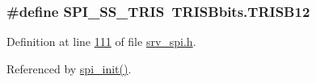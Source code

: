 \hypertarget{a00007_a1424f86a2482cfbcf68f709ce542e262}{
\subsubsection[{S\+P\+I\+\_\+\+S\+S\+\_\+\+T\+R\+I\+S}]{\setlength{\rightskip}{0pt plus 5cm}\#define S\+P\+I\+\_\+\+S\+S\+\_\+\+T\+R\+I\+S~T\+R\+I\+S\+Bbits.\+T\+R\+I\+S\+B12}}\label{a00007_a1424f86a2482cfbcf68f709ce542e262}


Definition at line \hyperlink{a00007_source_l00111}{111} of file \hyperlink{a00007_source}{srv\+\_\+spi.\+h}.



Referenced by \hyperlink{a00026_source_l00030}{spi\+\_\+init()}.



